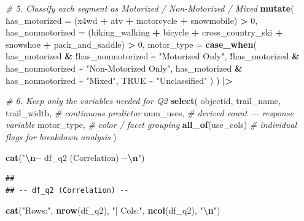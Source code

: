 \documentclass[
]{article}
\newenvironment{Shaded}{\begin{snugshade}}{\end{snugshade}}
\newcommand{\AttributeTok}[1]{\textcolor[rgb]{0.13,0.29,0.53}{#1}}
\newcommand{\CommentTok}[1]{\textcolor[rgb]{0.56,0.35,0.01}{\textit{#1}}}
\newcommand{\ConstantTok}[1]{\textcolor[rgb]{0.56,0.35,0.01}{#1}}
\newcommand{\DecValTok}[1]{\textcolor[rgb]{0.00,0.00,0.81}{#1}}
\newcommand{\FunctionTok}[1]{\textcolor[rgb]{0.13,0.29,0.53}{\textbf{#1}}}
\newcommand{\NormalTok}[1]{#1}
\newcommand{\SpecialCharTok}[1]{\textcolor[rgb]{0.81,0.36,0.00}{\textbf{#1}}}
\newcommand{\StringTok}[1]{\textcolor[rgb]{0.31,0.60,0.02}{#1}}
\begin{document}
\begin{Shaded}
\begin{Highlighting}[]
  \CommentTok{\# 5. Classify each segment as Motorized / Non{-}Motorized / Mixed}
  \FunctionTok{mutate}\NormalTok{(}
    \AttributeTok{has\_motorized    =}\NormalTok{ (x4wd }\SpecialCharTok{+}\NormalTok{ atv }\SpecialCharTok{+}\NormalTok{ motorcycle }\SpecialCharTok{+}\NormalTok{ snowmobile) }\SpecialCharTok{\textgreater{}} \DecValTok{0}\NormalTok{,}
    \AttributeTok{has\_nonmotorized =}\NormalTok{ (hiking\_walking }\SpecialCharTok{+}\NormalTok{ bicycle }\SpecialCharTok{+}\NormalTok{ cross\_country\_ski }\SpecialCharTok{+}
\NormalTok{                          snowshoe }\SpecialCharTok{+}\NormalTok{ pack\_and\_saddle) }\SpecialCharTok{\textgreater{}} \DecValTok{0}\NormalTok{,}
    \AttributeTok{motor\_type =} \FunctionTok{case\_when}\NormalTok{(}
\NormalTok{      has\_motorized }\SpecialCharTok{\&} \SpecialCharTok{!}\NormalTok{has\_nonmotorized  }\SpecialCharTok{\textasciitilde{}} \StringTok{"Motorized Only"}\NormalTok{,}
      \SpecialCharTok{!}\NormalTok{has\_motorized }\SpecialCharTok{\&}\NormalTok{ has\_nonmotorized  }\SpecialCharTok{\textasciitilde{}} \StringTok{"Non{-}Motorized Only"}\NormalTok{,}
\NormalTok{      has\_motorized }\SpecialCharTok{\&}\NormalTok{ has\_nonmotorized   }\SpecialCharTok{\textasciitilde{}} \StringTok{"Mixed"}\NormalTok{,}
      \ConstantTok{TRUE}                               \SpecialCharTok{\textasciitilde{}} \StringTok{"Unclassified"}
\NormalTok{    )}
\NormalTok{  ) }\SpecialCharTok{|\textgreater{}}
  
  \CommentTok{\# 6. Keep only the variables needed for Q2}
  \FunctionTok{select}\NormalTok{(}
\NormalTok{    objectid,}
\NormalTok{    trail\_name,}
\NormalTok{    trail\_width,          }\CommentTok{\# continuous predictor}
\NormalTok{    num\_uses,             }\CommentTok{\# derived count — response variable}
\NormalTok{    motor\_type,           }\CommentTok{\# color / facet grouping}
    \FunctionTok{all\_of}\NormalTok{(use\_cols)      }\CommentTok{\# individual flags for breakdown analysis}
\NormalTok{  )}

\FunctionTok{cat}\NormalTok{(}\StringTok{"}\SpecialCharTok{\textbackslash{}n}\StringTok{{-}{-} df\_q2 (Correlation) {-}{-}}\SpecialCharTok{\textbackslash{}n}\StringTok{"}\NormalTok{)}
\end{Highlighting}
\end{Shaded}

\begin{verbatim}
## 
## -- df_q2 (Correlation) --
\end{verbatim}

\begin{Shaded}
\begin{Highlighting}[]
\FunctionTok{cat}\NormalTok{(}\StringTok{"Rows:"}\NormalTok{, }\FunctionTok{nrow}\NormalTok{(df\_q2), }\StringTok{"| Cols:"}\NormalTok{, }\FunctionTok{ncol}\NormalTok{(df\_q2), }\StringTok{"}\SpecialCharTok{\textbackslash{}n}\StringTok{"}\NormalTok{)}
\end{Highlighting}
\end{Shaded}
\end{document}
